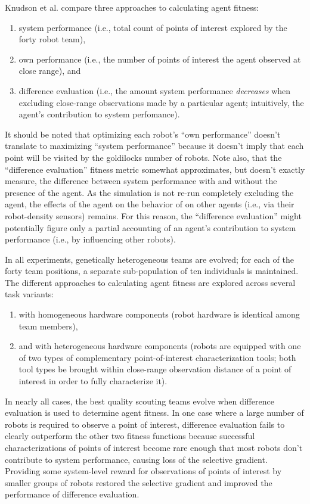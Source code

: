 Knudson et al. compare three approaches to calculating agent fitness:
\begin{enumerate}
\item system performance (i.e., total count of points of interest explored by the forty robot team),
\item own performance (i.e., the number of points of interest the agent observed at close range), and
\item difference evaluation (i.e., the amount system performance \textit{decreases} when excluding close-range observations made by a particular agent; intuitively, the agent's contribution to system perfomance).
\end{enumerate}
It should be noted that optimizing each robot's ``own performance'' doesn't translate to maximizing ``system performance'' because it doesn't imply that each point will be visited by the goldilocks number of robots.
Note also, that the ``difference evaluation'' fitness metric somewhat approximates, but doesn't exactly measure, the difference between system performance with and without the presence of the agent.
As the simulation is not re-run completely excluding the agent, the effects of the agent on the behavior of on other agents (i.e., via their robot-density sensors) remains.
For this reason, the ``difference evaluation'' might potentially figure only a partial accounting of an agent's contribution to system performance (i.e., by influencing other robots).

In all experiments, genetically heterogeneous teams are evolved;
for each of the forty team positions, a separate sub-population of ten individuals is maintained.
The different approaches to calculating agent fitness are explored across several task variants:
\begin{enumerate}
  \item with homogeneous hardware components (robot hardware is identical among team members),
  \item and with heterogeneous hardware components (robots are equipped with one of two types of complementary point-of-interest characterization tools; both tool types be brought within close-range observation distance of a point of interest in order to fully characterize it).
\end{enumerate}
In nearly all cases, the best quality scouting teams evolve when difference evaluation is used to determine agent fitness.
In one case where a large number of robots is required to observe a point of interest, difference evaluation fails to clearly outperform the other two fitness functions because successful characterizations of points of interest become rare enough that most robots don't contribute to system performance, causing loss of the selective gradient.
Providing some system-level reward for observations of points of interest by smaller groups of robots restored the selective gradient and improved the performance of difference evaluation.

